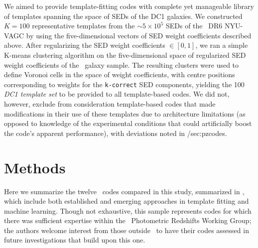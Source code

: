 We aimed to provide template-fitting codes with complete yet manageable library of templates spanning the space of SEDs of the DC1 galaxies.
We constructed $K=100$ representative templates from the $\sim 5 \times 10^{5}$ SEDs of the \sdss\ DR6 NYU-VAGC by using the five-dimensional vectors of SED weight coefficients described above.
After regularizing the SED weight coefficients $\in [0, 1]$, we ran a simple K-means clustering algorithm on the five-dimensional space of regularized SED weight coefficients of the \sdss\ galaxy sample.
The resulting clusters were used to define Voronoi cells in the space of weight coefficients, with centre positions corresponding to weights for the \texttt{k-correct} SED components, yielding the 100 \textit{DC1 template set} to be provided to all template-based codes.
We did not, however, exclude from consideration template-based codes that made modifications in their use of these templates due to architecture limitations (as opposed to knowledge of the experimental conditions that could artificially boost the code's apparent performance), with deviations noted in \Sect/{sec:pzcodes}.

\section{Methods}

Here we summarize the twelve \pzpdf\ codes compared in this study, summarized in , which include both established and emerging approaches in template fitting and machine learning.
Though not exhaustive, this sample represents codes for which there was sufficient expertise within the \desc\ Photometric Redshifts Working Group; the authors welcome interest from those outside \desc\ to have their codes assessed in future investigations that build upon this one.


